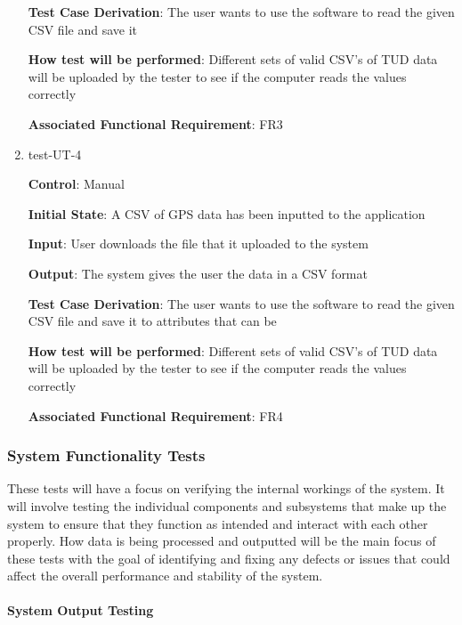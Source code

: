 \documentclass[12pt, titlepage]{article}
\begin{document}
\begin{enumerate}
\textbf{Test Case Derivation}: The user wants to use the software to read the given CSV file and save it
					
\textbf{How test will be performed}: Different sets of valid CSV's of TUD data will be uploaded by the tester to see if the computer reads the values correctly

\textbf{Associated Functional Requirement}: FR3

\item{test-UT-4\\}

\textbf{Control}: Manual 
					
\textbf{Initial State}: A CSV of GPS data has been inputted to the application
					
\textbf{Input}: User downloads the file that it uploaded to the system 
					
\textbf{Output}: The system gives the user the data in a CSV format 

\textbf{Test Case Derivation}: The user wants to use the software to read the given CSV file and save it to attributes that can be 
					
\textbf{How test will be performed}: Different sets of valid CSV's of TUD data will be uploaded by the tester to see if the computer reads the values correctly

\textbf{Associated Functional Requirement}: FR4
\end{enumerate}

\subsubsection{System Functionality Tests}

These tests will have a focus on verifying the internal workings of the system. It will involve testing the individual components and subsystems that make up the system to ensure that they function as intended and interact with each other properly. How data is being processed and outputted will be the main focus of these tests with the goal of identifying and fixing any defects or issues that could affect the overall performance and stability of the system.

\paragraph{System Output Testing}
\end{document}
